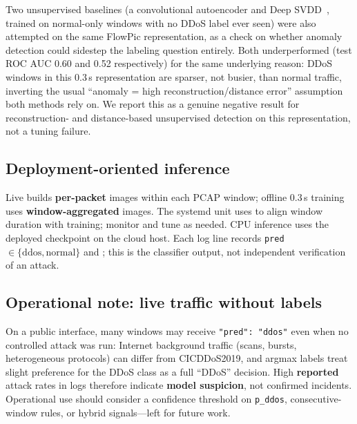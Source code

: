 Two unsupervised baselines (a convolutional autoencoder and Deep
SVDD~\cite{ruff2018deep}, trained on normal-only windows with no DDoS
label ever seen) were also attempted on the same FlowPic representation,
as a check on whether anomaly detection could sidestep the labeling
question entirely. Both underperformed (test ROC AUC 0.60 and 0.52
respectively) for the same underlying reason: DDoS windows in this 0.3\,s
representation are sparser, not busier, than normal traffic, inverting
the usual ``anomaly = high reconstruction/distance error'' assumption
both methods rely on. We report this as a genuine negative result for
reconstruction- and distance-based unsupervised detection on this
representation, not a tuning failure.

\subsection{Deployment-oriented inference}
Live  builds \textbf{per-packet} images within each
PCAP window; offline 0.3\,s training uses \textbf{window-aggregated} images.
The systemd unit uses  to align window duration with
training; monitor  and tune 
as needed. CPU inference uses the deployed checkpoint
on the cloud host. Each log line records \texttt{pred} $\in \{\mathrm{ddos},
\mathrm{normal}\}$ and ; this is the classifier output, not
independent verification of an attack.

\subsection{Operational note: live traffic without labels}
On a public interface, many windows may receive \texttt{"pred": "ddos"} even when
no controlled attack was run: Internet background traffic (scans, bursts,
heterogeneous protocols) can differ from CICDDoS2019, and argmax labels treat
slight preference for the DDoS class as a full ``DDoS'' decision. High
\textbf{reported} attack rates in logs therefore indicate \textbf{model
suspicion}, not confirmed incidents. Operational use should consider a
confidence threshold on \texttt{p\_ddos}, consecutive-window rules, or hybrid
signals---left for future work.

